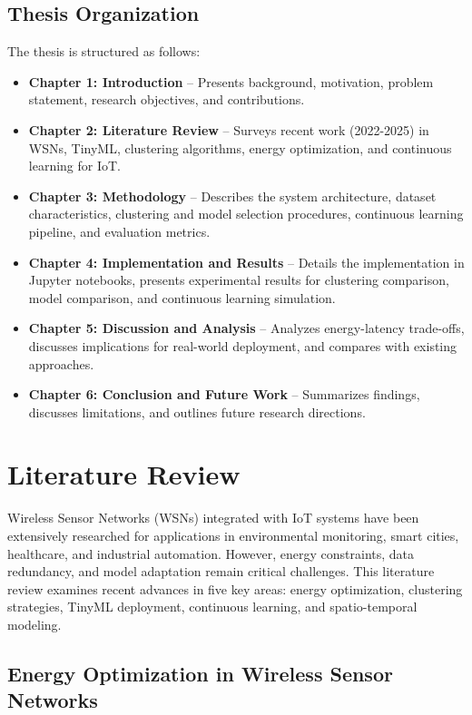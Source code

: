 \documentclass[12pt,a4paper]{article}
\begin{document}
\subsection{Thesis Organization}
The thesis is structured as follows:
\begin{itemize}
    \item \textbf{Chapter 1: Introduction} – Presents background, motivation, problem statement, research objectives, and contributions.
    \item \textbf{Chapter 2: Literature Review} – Surveys recent work (2022-2025) in WSNs, TinyML, clustering algorithms, energy optimization, and continuous learning for IoT.
    \item \textbf{Chapter 3: Methodology} – Describes the system architecture, dataset characteristics, clustering and model selection procedures, continuous learning pipeline, and evaluation metrics.
    \item \textbf{Chapter 4: Implementation and Results} – Details the implementation in Jupyter notebooks, presents experimental results for clustering comparison, model comparison, and continuous learning simulation.
    \item \textbf{Chapter 5: Discussion and Analysis} – Analyzes energy-latency trade-offs, discusses implications for real-world deployment, and compares with existing approaches.
    \item \textbf{Chapter 6: Conclusion and Future Work} – Summarizes findings, discusses limitations, and outlines future research directions.
\end{itemize}

\newpage
\section{Literature Review}

Wireless Sensor Networks (WSNs) integrated with IoT systems have been extensively researched for applications in environmental monitoring, smart cities, healthcare, and industrial automation. However, energy constraints, data redundancy, and model adaptation remain critical challenges. This literature review examines recent advances in five key areas: energy optimization, clustering strategies, TinyML deployment, continuous learning, and spatio-temporal modeling.

\subsection{Energy Optimization in Wireless Sensor Networks}
\end{document}
